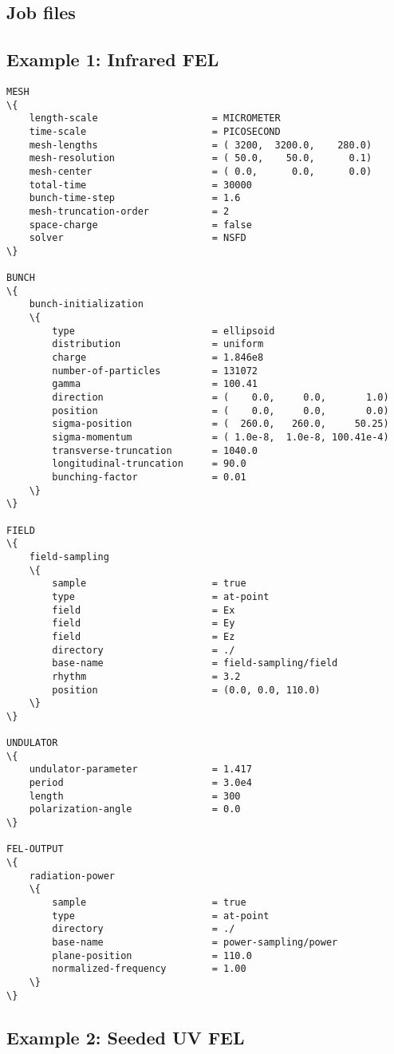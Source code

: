 \begin{appendices}
\chapter{Job files}
\label{job_files}

\section{Example 1: Infrared FEL}
\label{job_file_1}

\begin{snugshade}
\begin{Verbatim}[fontsize=\footnotesize, tabsize=4, fontfamily=courier, fontseries=b, commandchars=\\\{\}, obeytabs]
MESH
\{
	length-scale					= MICROMETER
	time-scale						= PICOSECOND
	mesh-lengths					= ( 3200,  3200.0,    280.0)
	mesh-resolution					= ( 50.0,    50.0,      0.1)
	mesh-center						= ( 0.0,      0.0,      0.0)
	total-time						= 30000
	bunch-time-step					= 1.6
	mesh-truncation-order			= 2
	space-charge					= false
	solver							= NSFD
\}
	
BUNCH
\{
	bunch-initialization
	\{
		type						= ellipsoid
		distribution				= uniform
		charge						= 1.846e8
		number-of-particles			= 131072
		gamma						= 100.41
		direction					= (    0.0,     0.0,       1.0)
		position					= (    0.0,     0.0,       0.0)
		sigma-position				= (  260.0,   260.0,     50.25)
		sigma-momentum				= ( 1.0e-8,  1.0e-8, 100.41e-4)
		transverse-truncation		= 1040.0
		longitudinal-truncation		= 90.0
		bunching-factor				= 0.01
	\}
\}
	
FIELD
\{
	field-sampling
	\{
		sample						= true
		type						= at-point
		field						= Ex
		field						= Ey
		field						= Ez
		directory					= ./
		base-name					= field-sampling/field
		rhythm						= 3.2
		position					= (0.0, 0.0, 110.0)
	\}
\}
	
UNDULATOR
\{
	undulator-parameter				= 1.417
	period							= 3.0e4
	length							= 300
	polarization-angle				= 0.0
\}
	
FEL-OUTPUT
\{
	radiation-power
	\{
		sample						= true
		type						= at-point
		directory					= ./
		base-name					= power-sampling/power
		plane-position				= 110.0
		normalized-frequency		= 1.00
	\}
\}
\end{Verbatim}
\end{snugshade}

\section{Example 2: Seeded UV FEL}
\label{job_file_2}


\end{appendices}
